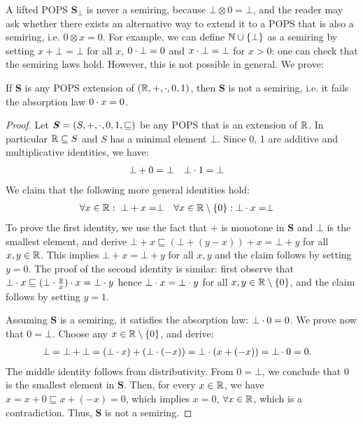 A lifted POPS $\bm S_\bot$ is never a semiring, because
$\bot \otimes 0 = \bot$, and the reader may ask whether there exists
an alternative way to extend it to a POPS that is also a semiring,
i.e. $0 \otimes x = 0$.  For example, we can define
$\mathbb N \cup \{\bot\}$ as a semiring by setting $x + \bot = \bot$ for
all $x$, $0 \cdot \bot = 0$ and $x \cdot \bot = \bot$ for $x > 0$: one can
check that the semiring laws hold.  However, this is not possible in
general.  We prove:

\begin{lmm} \label{lemma:no:extension:for:r} If $\bm S$ is any POPS
  extension of $(\mathbb R, +, \cdot, 0, 1)$, then $\bm S$ is not a semiring,
  i.e. it fails the absorption law $0 \cdot x = 0$.
\end{lmm}
\begin{proof}
  Let $\bm S = (S, +, \cdot, 0, 1, \sqsubseteq)$ be any POPS that is an
  extension of $\mathbb R$.  In particular $\mathbb R \subseteq S$ and $S$ has a
  minimal element $\bot$.  Since 0, 1 are additive and multiplicative identities,
  we have:
%
  \begin{align*}
    \bot+0 &= \bot & \bot \cdot 1 &= \bot
  \end{align*}
%
  We claim that the following more general identities hold:
%
  \begin{align*}
    \forall x \in \mathbb R:\  \bot+x = & \bot & \forall x \in \mathbb R \setminus \{0\}: \bot \cdot x = & \bot
  \end{align*}
%
  To prove the first identity, we use the fact that $+$ is monotone in
  $\bm S$ and $\bot$ is the smallest element, and derive
  $\bot + x \sqsubseteq (\bot + (y-x)) +x = \bot + y$ for all
  $x,y\in\mathbb R$.  This implies $\bot + x = \bot + y$ for all $x,y$ and
  the claim follows by setting $y=0$.  The proof of the second
  identity is similar: first observe that
  $\bot \cdot x \sqsubseteq (\bot \cdot \frac{y}{x}) \cdot x=\bot
  \cdot y$ hence $\bot \cdot x = \bot \cdot y$ for all
  $x, y \in \mathbb R \setminus \{0\}$, and the claim follows by setting
  $y=1$.

  Assuming $\bm S$ is a semiring, it satisfies the absorption law:
  $\bot \cdot 0 = 0$.  We prove now that $0 = \bot$.  Choose any
  $x \in \mathbb R \setminus \{0\}$, and derive:
%
  \begin{align*}
    \bot = \bot + \bot =
    (\bot  \cdot  x) + (\bot \cdot (-x))
    = \bot \cdot (x+(-x)) &= \bot  \cdot  0 = 0.
  \end{align*}
%
  The middle identity follows from distributivity. From $0 = \bot$, we
  conclude that $0$ is the smallest element in $\bm S$.  Then, for
  every $x \in \mathbb R$, we have $x = x+0 \sqsubseteq x+(-x) = 0$, which
  implies $x = 0$, $\forall x \in \mathbb R$, which is a contradiction.
  Thus, $\bm S$ is not a semiring.
\end{proof}

